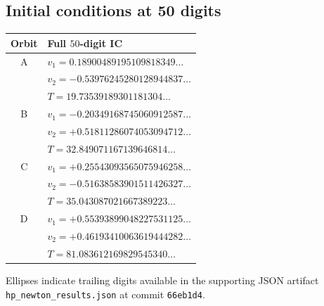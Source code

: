 \documentclass[11pt]{article}
\begin{document}
\subsection{Initial conditions at 50 digits}

\begin{tabular}{@{}cl@{}}
\toprule
Orbit & Full $50$-digit IC \\
\midrule
A & $v_1 = 0.18900489195109818349\ldots$ \\
  & $v_2 = -0.53976245280128944837\ldots$ \\
  & $T = 19.73539189301181304\ldots$ \\
B & $v_1 = -0.20349168745060912587\ldots$ \\
  & $v_2 = +0.51811286074053094712\ldots$ \\
  & $T = 32.849071167139646814\ldots$ \\
C & $v_1 = +0.25543093565075946258\ldots$ \\
  & $v_2 = -0.51638583901511426327\ldots$ \\
  & $T = 35.043087021667389223\ldots$ \\
D & $v_1 = +0.55393899048227531125\ldots$ \\
  & $v_2 = +0.46193410063619444282\ldots$ \\
  & $T = 81.083612169829545340\ldots$ \\
\bottomrule
\end{tabular}

Ellipses indicate trailing digits available in the supporting JSON
artifact \texttt{hp\_newton\_results.json} at commit
\texttt{66eb1d4}.



\end{document}
